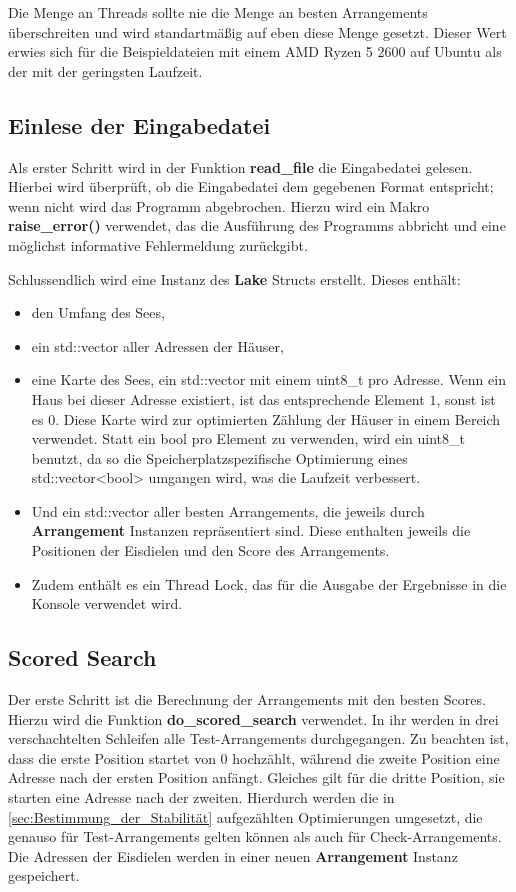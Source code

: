 \documentclass[a4paper,10pt,ngerman,captions=figureheading]{scrartcl}
\begin{document}
Die Menge an Threads sollte nie die Menge an besten Arrangements überschreiten und wird standartmäßig auf eben diese Menge gesetzt.
Dieser Wert erwies sich für die Beispieldateien mit einem AMD Ryzen 5 2600 auf Ubuntu als der mit der geringsten Laufzeit.

\subsection{Einlese der Eingabedatei}
\label{sec:Einlese_der_Eingabedatei}
Als erster Schritt wird in der Funktion \textbf{read\_file} die Eingabedatei gelesen.
Hierbei wird überprüft, ob die Eingabedatei dem gegebenen Format entspricht; wenn nicht wird das Programm abgebrochen.
Hierzu wird ein Makro \textbf{raise\_error()} verwendet, das die Ausführung des Programms abbricht und eine möglichst informative Fehlermeldung zurückgibt.

Schlussendlich wird eine Instanz des \textbf{Lake} Structs erstellt.
Dieses enthält:
\begin{itemize}
    \item den Umfang des Sees,
    \item ein std::vector aller Adressen der Häuser,
    \item eine Karte des Sees, ein std::vector mit einem uint8\_t pro Adresse.
          Wenn ein Haus bei dieser Adresse existiert, ist das entsprechende Element $1$, sonst ist es $0$.
          Diese Karte wird zur optimierten Zählung der Häuser in einem Bereich verwendet.
          Statt ein bool pro Element zu verwenden, wird ein uint8\_t benutzt, da so die Speicherplatzspezifische Optimierung eines std::vector<bool> umgangen wird, was die Laufzeit verbessert.
    \item Und ein std::vector aller besten Arrangements, die jeweils durch \textbf{Arrangement} Instanzen repräsentiert sind.
          Diese enthalten jeweils die Positionen der Eisdielen und den Score des Arrangements.
    \item Zudem enthält es ein Thread Lock, das für die Ausgabe der Ergebnisse in die Konsole verwendet wird.
\end{itemize}

\subsection{Scored Search}
\label{sec:Scored_Search}
Der erste Schritt ist die Berechnung der Arrangements mit den besten Scores.
Hierzu wird die Funktion \textbf{do\_scored\_search} verwendet.
In ihr werden in drei verschachtelten Schleifen alle Test-Arrangements durchgegangen.
Zu beachten ist, dass die erste Position startet von $0$ hochzählt, während die zweite Position eine Adresse nach der ersten Position anfängt.
Gleiches gilt für die dritte Position, sie starten eine Adresse nach der zweiten.
Hierdurch werden die in \autoref{sec:Bestimmung_der_Stabilität} aufgezählten Optimierungen umgesetzt, die genauso für Test-Arrangements gelten können als auch für Check-Arrangements.
Die Adressen der Eisdielen werden in einer neuen \textbf{Arrangement} Instanz gespeichert.
\end{document}
